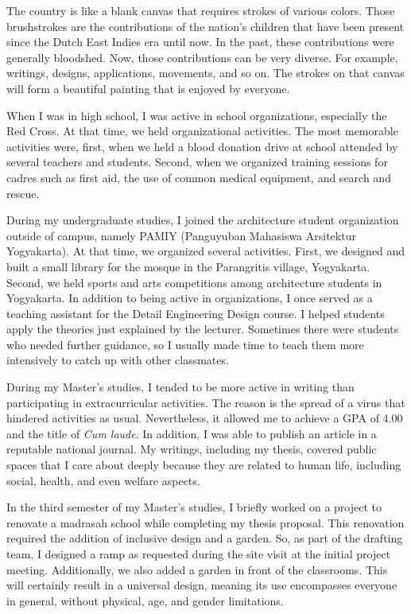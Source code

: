 \documentclass[../main.tex]{subfiles}
\begin{document}
The country is like a blank canvas that requires strokes of various colors. Those brushstrokes are the contributions of the nation's children that have been present since the Dutch East Indies era until now. In the past, these contributions were generally bloodshed. Now, those contributions can be very diverse. For example, writings, designs, applications, movements, and so on. The strokes on that canvas will form a beautiful painting that is enjoyed by everyone.

When I was in high school, I was active in school organizations, especially the Red Cross. At that time, we held organizational activities. The most memorable activities were, first, when we held a blood donation drive at school attended by several teachers and students. Second, when we organized training sessions for cadres such as first aid, the use of common medical equipment, and search and rescue.

During my undergraduate studies, I joined the architecture student organization outside of campus, namely PAMIY (Panguyuban Mahasiswa Arsitektur Yogyakarta). At that time, we organized several activities. First, we designed and built a small library for the mosque in the Parangritis village, Yogyakarta. Second, we held sports and arts competitions among architecture students in Yogyakarta. In addition to being active in organizations, I once served as a teaching assistant for the Detail Engineering Design course. I helped students apply the theories just explained by the lecturer. Sometimes there were students who needed further guidance, so I usually made time to teach them more intensively to catch up with other classmates.

During my Master's studies, I tended to be more active in writing than participating in extracurricular activities. The reason is the spread of a virus that hindered activities as usual. Nevertheless, it allowed me to achieve a GPA of 4.00 and the title of \textit{Cum laude}. In addition, I was able to publish an article in a reputable national journal. My writings, including my thesis, covered public spaces that I care about deeply because they are related to human life, including social, health, and even welfare aspects.

In the third semester of my Master's studies, I briefly worked on a project to renovate a madrasah school while completing my thesis proposal. This renovation required the addition of inclusive design and a garden. So, as part of the drafting team, I designed a ramp as requested during the site visit at the initial project meeting. Additionally, we also added a garden in front of the classrooms. This will certainly result in a universal design, meaning its use encompasses everyone in general, without physical, age, and gender limitations.
\end{document}
